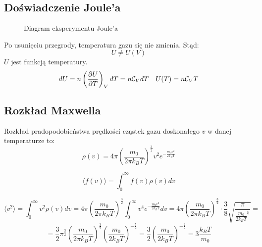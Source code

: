 \documentclass{../notatki}
\begin{document}
\subsection{Doświadczenie Joule'a}

\begin{figure}[h]
  \centering
  \caption{Diagram eksperymentu Joule'a}
\end{figure}

Po usunięciu przegrody, temperatura gazu się nie zmienia. Stąd:
$$
U \neq U(V)
$$
$U$ jest funkcją temperatury.
$$
dU = n\left(\frac{\partial U}{\partial T}\right)_V dT = n\mathcal{C}_V dT \quad U(T) = n\mathcal{C}_V T
$$

\subsection{Rozkład Maxwella}

Rozkład pradopodobieństwa prędkości cząstek gazu doskonałego $v$ w
danej temperaturze to:
$$
\rho(v) = 4 \pi \left(\frac{m_0}{2\pi k_BT}\right)^{\frac{3}{2}} v^2
e^{-\frac{m_0v^2}{2k_BT}}
$$

\begin{examplebox}
  $$
  \langle f(v) \rangle = \int_0^\infty f(v) \rho(v) dv
  $$

  \vspace{1em}
  $$
  \langle v^2 \rangle = \int_0^\infty v^2 \rho(v) dv = 4 \pi
  \left(\frac{m_0}{2\pi k_BT}\right)^{\frac{3}{2}} \int_0^\infty v^4
  e^{-\frac{m_0v^2}{2k_BT}} dv = 4 \pi \left(\frac{m_0}{2\pi
  k_BT}\right)^{\frac{3}{2}} \cdot \frac{3}{8}
  \sqrt{\frac{\pi}{\frac{m_0}{2k_BT}^5}} =
  $$
  $$
  = \frac{3}{2} \pi^{\frac{3}{2}} \left(\frac{m_0}{2\pi
  k_BT}\right)^{\frac{3}{2}}
  \left(\frac{m_0}{2k_BT}\right)^{-\frac{5}{2}} = \frac{3}{2}
  \left(\frac{m_0}{2k_BT}\right)^{-\frac{2}{2}} = 3 \frac{k_BT}{m_0}
  $$
\end{examplebox}
\end{document}
